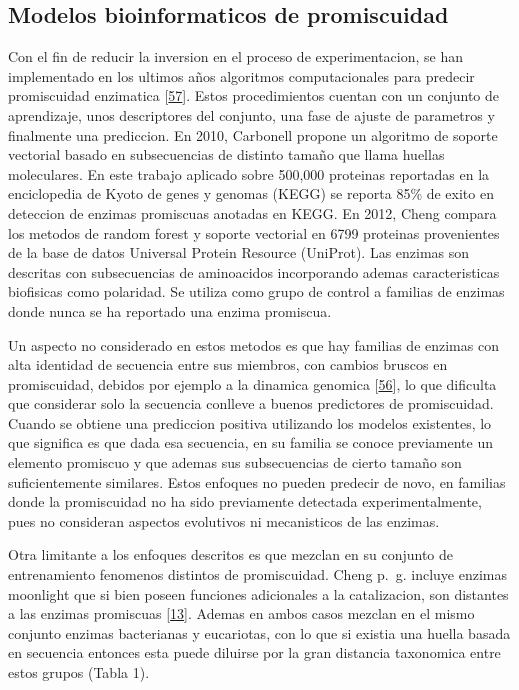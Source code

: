 \documentclass[12pt,twoside]{reedthesis}
\begin{document}
  \subsection{Modelos bioinformaticos de
  promiscuidad}\label{modelos-bioinformaticos-de-promiscuidad}
  
  Con el fin de reducir la inversion en el proceso de experimentacion, se
  han implementado en los ultimos años algoritmos computacionales para
  predecir promiscuidad enzimatica
  {[}\protect\hyperlink{ref-carbonell_molecular_2010}{57}{]}. Estos
  procedimientos cuentan con un conjunto de aprendizaje, unos descriptores
  del conjunto, una fase de ajuste de parametros y finalmente una
  prediccion. En 2010, Carbonell propone un algoritmo de soporte vectorial
  basado en subsecuencias de distinto tamaño que llama huellas
  moleculares. En este trabajo aplicado sobre 500,000 proteinas reportadas
  en la enciclopedia de Kyoto de genes y genomas (KEGG) se reporta 85\% de
  exito en deteccion de enzimas promiscuas anotadas en KEGG. En 2012,
  Cheng compara los metodos de random forest y soporte vectorial en 6799
  proteinas provenientes de la base de datos Universal Protein Resource
  (UniProt). Las enzimas son descritas con subsecuencias de aminoacidos
  incorporando ademas caracteristicas biofisicas como polaridad. Se
  utiliza como grupo de control a familias de enzimas donde nunca se ha
  reportado una enzima promiscua.
  
  Un aspecto no considerado en estos metodos es que hay familias de
  enzimas con alta identidad de secuencia entre sus miembros, con cambios
  bruscos en promiscuidad, debidos por ejemplo a la dinamica genomica
  {[}\protect\hyperlink{ref-noda-garcia_evolution_2013}{56}{]}, lo que
  dificulta que considerar solo la secuencia conlleve a buenos predictores
  de promiscuidad. Cuando se obtiene una prediccion positiva utilizando
  los modelos existentes, lo que significa es que dada esa secuencia, en
  su familia se conoce previamente un elemento promiscuo y que ademas sus
  subsecuencias de cierto tamaño son suficientemente similares. Estos
  enfoques no pueden predecir de novo, en familias donde la promiscuidad
  no ha sido previamente detectada experimentalmente, pues no consideran
  aspectos evolutivos ni mecanisticos de las enzimas.
  
  Otra limitante a los enfoques descritos es que mezclan en su conjunto de
  entrenamiento fenomenos distintos de promiscuidad. Cheng p.~g. incluye
  enzimas moonlight que si bien poseen funciones adicionales a la
  catalizacion, son distantes a las enzimas promiscuas
  {[}\protect\hyperlink{ref-copley_enzymes_2003}{13}{]}. Ademas en ambos
  casos mezclan en el mismo conjunto enzimas bacterianas y eucariotas, con
  lo que si existia una huella basada en secuencia entonces esta puede
  diluirse por la gran distancia taxonomica entre estos grupos (Tabla 1).
  
\end{document}
